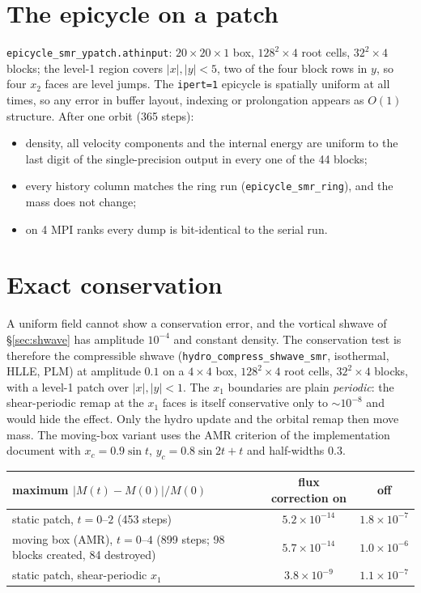 \documentclass[11pt]{article}
\newcommand{\code}[1]{\texttt{#1}}
\newcommand{\file}[1]{\texttt{\small #1}}
\begin{document}
\section{The epicycle on a patch}
\label{sec:epicycle}
\file{epicycle\_smr\_ypatch.athinput}: $20\times20\times1$ box, $128^2\times4$ root
cells, $32^2\times4$ blocks; the level-1 region covers $|x|, |y| < 5$, two of the four
block rows in $y$, so four $x_2$ faces are level jumps. The \code{ipert=1} epicycle is
spatially uniform at all times, so any error in buffer layout, indexing or prolongation
appears as $O(1)$ structure. After one orbit (365 steps):
\begin{itemize}\itemsep2pt
\item density, all velocity components and the internal energy are uniform to the last
      digit of the single-precision output in every one of the 44 blocks;
\item every history column matches the ring run (\file{epicycle\_smr\_ring}), and the
      mass does not change;
\item on 4 MPI ranks every dump is bit-identical to the serial run.
\end{itemize}

\section{Exact conservation}
\label{sec:conservation}
A uniform field cannot show a conservation error, and the vortical shwave of
\S\ref{sec:shwave} has amplitude $10^{-4}$ and constant density. The conservation test
is therefore the compressible shwave (\file{hydro\_compress\_shwave\_smr}, isothermal,
HLLE, PLM) at amplitude $0.1$ on a $4\times4$ box, $128^2\times4$ root cells, $32^2\times4$
blocks, with a level-1 patch over $|x|, |y| < 1$. The $x_1$ boundaries are plain
\emph{periodic}: the shear-periodic remap at the $x_1$ faces is itself conservative only to
$\sim10^{-8}$ and would hide the effect. Only the hydro update and the orbital remap then
move mass. The moving-box variant uses the AMR criterion of the implementation document
with $x_c = 0.9\sin t$, $y_c = 0.8\sin 2t + t$ and half-widths $0.3$.

\begin{center}
\small
\begin{tabular}{@{}lcc@{}}
\toprule
maximum $|M(t) - M(0)|/M(0)$ & flux correction on & off \\
\midrule
static patch, $t = 0$--$2$ (453 steps)                                 & $5.2\times10^{-14}$ & $1.8\times10^{-7}$ \\
moving box (AMR), $t = 0$--$4$ (899 steps; 98 blocks created, 84 destroyed) & $5.7\times10^{-14}$ & $1.0\times10^{-6}$ \\
static patch, shear-periodic $x_1$                                    & $3.8\times10^{-9}$ & $1.1\times10^{-7}$ \\
\bottomrule
\end{tabular}
\end{center}
\end{document}
